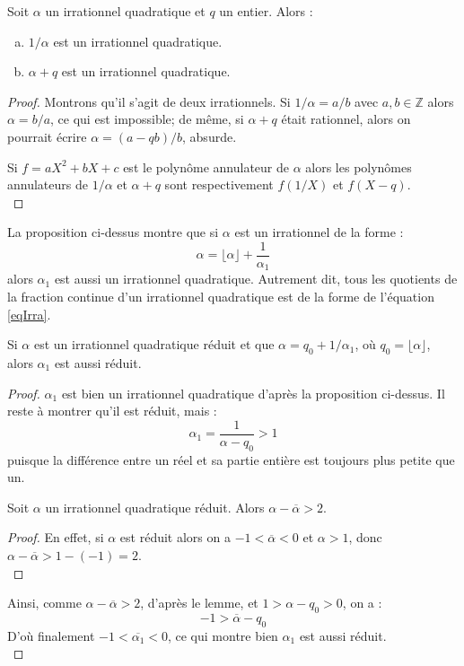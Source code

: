 \documentclass[a4paper]{article} %
\numberwithin{equation}{section}
\begin{document}
\begin{prop}
\label{autrIrra}
Soit $\alpha$ un irrationnel quadratique et $q$ un entier. Alors :
\begin{enumerate}[(a)]
\item $1/\alpha$ est un irrationnel quadratique.
\item $\alpha+q$ est un irrationnel quadratique.
\end{enumerate}
\end{prop}
\begin{proof}
Montrons qu'il s'agit de deux irrationnels. Si $1/\alpha = a/b$ avec $a, b\in\mathbb{Z}$ alors $\alpha = b/a$, ce qui est impossible; de même, si $\alpha + q$ était rationnel, alors on pourrait écrire $\alpha = (a - qb)/b$, absurde.\par
Si $f = aX^2 + bX + c$ est le polynôme annulateur de $\alpha$ alors les polynômes annulateurs de $1/\alpha$ et $\alpha + q$ sont respectivement $f(1/X)$ et $f(X - q)$.\\
\end{proof}
\begin{rem}
La proposition ci-dessus montre que si $\alpha$ est un irrationnel de la forme :
\[\alpha = \lfloor\alpha\rfloor + \frac{1}{\alpha_1}\]
alors $\alpha_1$ est aussi un irrationnel quadratique. Autrement dit, tous les quotients de la fraction continue d'un irrationnel quadratique est de la forme de l'équation \ref{eqIrra}.
\end{rem}
\begin{prop}
\label{formIrra}
Si $\alpha$ est un irrationnel quadratique réduit et que $\alpha = q_0 + 1/\alpha_1$, où $q_0 = \lfloor\alpha\rfloor$, alors $\alpha_1$ est aussi réduit.
\end{prop}
\begin{proof}
$\alpha_1$ est bien un irrationnel quadratique d'après la proposition ci-dessus. Il reste à montrer qu'il est réduit, mais :
\[\alpha_1 = \dfrac{1}{\alpha - q_0} > 1\]
puisque la différence entre un réel et sa partie entière est toujours plus petite que un.
\begin{lem}
\label{lemIrra}
Soit $\alpha$ un irrationnel quadratique réduit. Alors $\alpha - \overline{\alpha} > 2$.
\end{lem}
\begin{proof}
En effet, si $\alpha$ est réduit alors on a $-1 <\overline{\alpha} < 0$ et $\alpha > 1$, donc $\alpha - \overline{\alpha} > 1 - (-1) = 2$.\\
\end{proof}
Ainsi, comme $\alpha - \overline{\alpha} > 2$, d'après le lemme, et $1 > \alpha - q_0 > 0$, on a :
\[-1 > \overline{\alpha} - q_0\]
D'où finalement $ -1 < \overline{\alpha_1} < 0$, ce qui montre bien $\alpha_1$ est aussi réduit.\\
\end{proof}
\end{document}

